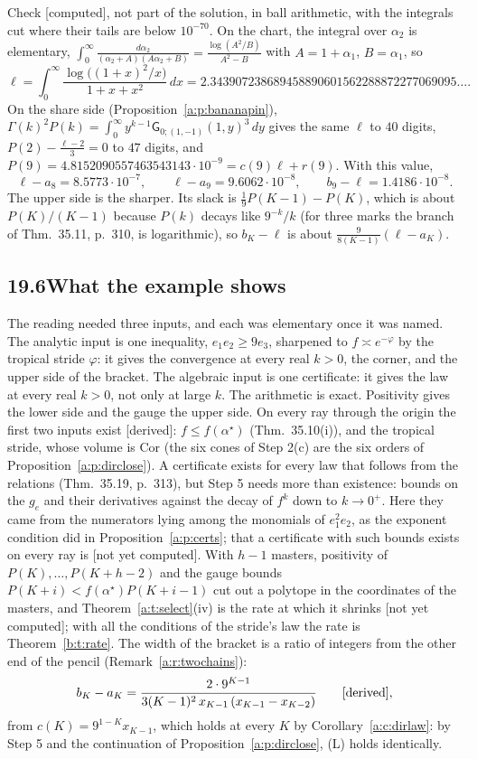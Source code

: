 \documentclass[11pt]{article}
\newcommand{\sG}{\mathsf G}
\theoremstyle{plain}
\theoremstyle{definition}
\theoremstyle{remark}
\newcommand{\derived}{\textup{[derived]}}
\newcommand{\computed}{\textup{[computed]}}
\newcommand{\notyet}{\textup{[not yet computed]}}
\begin{document}
\noindent Check \computed, not part of the solution, in ball arithmetic, with the integrals cut where their tails are below $10^{-70}$. On the chart, the integral over $\alpha_2$ is elementary, $\int_0^\infty\frac{d\alpha_2}{(\alpha_2+A)(A\alpha_2+B)}=\frac{\log(A^2/B)}{A^2-B}$ with $A=1+\alpha_1$, $B=\alpha_1$, so
\[
\ell=\int_0^\infty\frac{\log\big((1+x)^2/x\big)}{1+x+x^2}\,dx=2.343907238689458890601562288872277069095\ldots .
\]
On the share side (Proposition~\ref{a:p:bananapin}), $\Gamma(k)^2P(k)=\int_0^\infty y^{k-1}\sG_{0;(1,-1)}(1,y)^3\,dy$ gives the same $\ell$ to $40$ digits, $P(2)-\frac{\ell-2}3=0$ to $47$ digits, and $P(9)=4.8152090557463543143\cdot10^{-9}=c(9)\ell+r(9)$. With this value,
\[
\ell-a_8=8.5773\cdot10^{-7},\qquad \ell-a_9=9.6062\cdot10^{-8},\qquad b_9-\ell=1.4186\cdot10^{-8}.
\]
The upper side is the sharper. Its slack is $\frac19P(K-1)-P(K)$, which is about $P(K)/(K-1)$ because $P(k)$ decays like $9^{-k}/k$ (for three marks the branch of Thm.~35.11, p.~310, is logarithmic), so $b_K-\ell$ is about $\frac9{8(K-1)}(\ell-a_K)$.

\subsection*{19.6\quad What the example shows}

The reading needed three inputs, and each was elementary once it was named. The analytic input is one inequality, $e_1e_2\ge9e_3$, sharpened to $f\asymp e^{-\varphi}$ by the tropical stride $\varphi$: it gives the convergence at every real $k>0$, the corner, and the upper side of the bracket. The algebraic input is one certificate: it gives the law at every real $k>0$, not only at large $k$. The arithmetic is exact. Positivity gives the lower side and the gauge the upper side. On every ray through the origin the first two inputs exist \derived: $f\le f(\alpha^\star)$ (Thm.~35.10(i)), and the tropical stride, whose volume is $\mathrm{Cor}$ (the six cones of Step 2(c) are the six orders of Proposition~\ref{a:p:dirclose}). A certificate exists for every law that follows from the relations (Thm.~35.19, p.~313), but Step 5 needs more than existence: bounds on the $g_e$ and their derivatives against the decay of $f^k$ down to $k\to0^+$. Here they came from the numerators lying among the monomials of $e_1^2e_2$, as the exponent condition did in Proposition~\ref{a:p:certs}; that a certificate with such bounds exists on every ray is \notyet. With $h-1$ masters, positivity of $P(K),\dots,P(K+h-2)$ and the gauge bounds $P(K+i)<f(\alpha^\star)P(K+i-1)$ cut out a polytope in the coordinates of the masters, and Theorem~\ref{a:t:select}(iv) is the rate at which it shrinks \notyet; with all the conditions of the stride's law the rate is Theorem~\ref{b:t:rate}. The width of the bracket is a ratio of integers from the other end of the pencil (Remark~\ref{a:r:twochains}):
\[
b_K-a_K=\frac{2\cdot9^{K-1}}{3(K-1)^2\,x_{K-1}\,(x_{K-1}-x_{K-2})}\qquad\derived,
\]
from $c(K)=9^{1-K}x_{K-1}$, which holds at every $K$ by Corollary~\ref{a:c:dirlaw}: by Step 5 and the continuation of Proposition~\ref{a:p:dirclose}, (L) holds identically.
\end{document}
